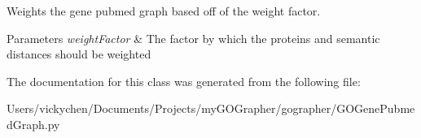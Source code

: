 Weights the gene pubmed graph based off of the weight factor. 


\begin{DoxyParams}{Parameters}
{\em weightFactor} & The factor by which the proteins and semantic distances should be weighted \\
\hline
\end{DoxyParams}


The documentation for this class was generated from the following file:\begin{DoxyCompactItemize}
\item 
Users/vickychen/Documents/Projects/myGOGrapher/gographer/GOGenePubmedGraph.py\end{DoxyCompactItemize}
